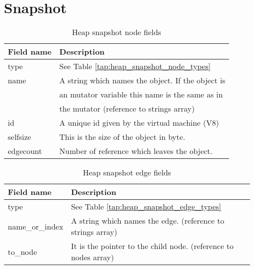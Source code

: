 \section{Snapshot}
		\begin{table}[!htbp]
			\centering
			\begin{tabular}{|l||l|}
				\hline
				\textbf{Field name}	&	\textbf{Description} 								\\	\hline \hline
				type			&	See Table \ref{tap:heap_snapshot_node_types}			\\	\hline
				name			&	A string which names the object. If the object is		\\
								&	an mutator variable this name is the same as in 		\\
								&	the mutator (reference to strings array)				\\	\hline	
				id				&	A unique id given by the virtual machine (V8)			\\	\hline
				selfsize		&	This is the size of the object in byte.					\\	\hline
				edgecount		&	Number of reference which leaves the object.			\\	\hline	
			\end{tabular}
			\caption{Heap snapshot node fields}
			\label{tap:heap_snapshot_node_fields}
		\end{table}
		
		\begin{table}[!htbp]
			\centering
			\begin{tabular}{|l||l|}
				\hline
				\textbf{Field name}	&	\textbf{Description}										\\	\hline \hline
				type			&	See Table \ref{tap:heap_snapshot_edge_types}					\\	\hline
				name\_or\_index	&	A string which names the edge. (reference to strings array)		\\	\hline
				to\_node		&	It is the pointer to the child node. (reference to nodes array)	\\	\hline 
			\end{tabular}
			\caption{Heap snapshot edge fields}
			\label{tap:heap_snapshot_edge_fields}
		\end{table}
		

